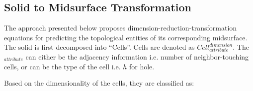 %
%


\subsection{Solid to Midsurface Transformation} \label{sec:topoval:solidsurf}

The approach presented below proposes dimension-reduction-transformation equations for predicting the topological entities of its corresponding midsurface. The solid is first decomposed into ``Cells''. Cells are denoted as $Cell^{dimension}_{attribute}$. The $_{attribute}$ can either be the adjacency information i.e. number of neighbor-touching cells, or can be the type of the cell i.e. $h$ for hole.

Based on the dimensionality of the cells, they are classified as:

